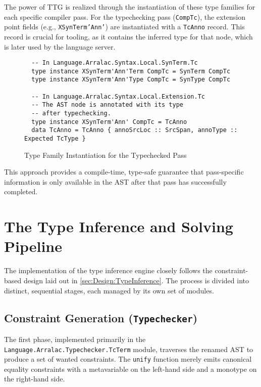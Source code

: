The power of TTG is realized through the instantiation of these type families for each specific compiler pass. For the typechecking pass (\texttt{CompTc}), the extension point fields (e.g., \texttt{XSynTerm'Ann'}) are instantiated with a \texttt{TcAnno} record. This record is crucial for tooling, as it contains the inferred type for that node, which is later used by the language server.

\begin{figure}
  \centering
  \begin{verbatim}
  -- In Language.Arralac.Syntax.Local.SynTerm.Tc
  type instance XSynTerm'Ann'Term CompTc = SynTerm CompTc
  type instance XSynTerm'Ann'Type CompTc = SynType CompTc

  -- In Language.Arralac.Syntax.Local.Extension.Tc
  -- The AST node is annotated with its type 
  -- after typechecking.
  type instance XSynTerm'Ann' CompTc = TcAnno
  data TcAnno = TcAnno { annoSrcLoc :: SrcSpan, annoType :: Expected TcType }
  \end{verbatim}
  \caption{Type Family Instantiation for the Typechecked Pass}
\end{figure}

This approach provides a compile-time, type-safe guarantee that pass-specific information is only available in the AST after that pass has successfully completed.

\section{The Type Inference and Solving Pipeline}
\label{sec:Implementation:Pipeline}

The implementation of the type inference engine closely follows the constraint-based design laid out in \cref{sec:Design:TypeInference}. The process is divided into distinct, sequential stages, each managed by its own set of modules.

\subsection{Constraint Generation (\texttt{Typechecker})}
The first phase, implemented primarily in the \\ \texttt{Language.Arralac.Typechecker.TcTerm} module, traverses the renamed AST to produce a set of wanted constraints. The \texttt{unify} function merely emits canonical equality constraints with a metavariable on the left-hand side and a monotype on the right-hand side.

